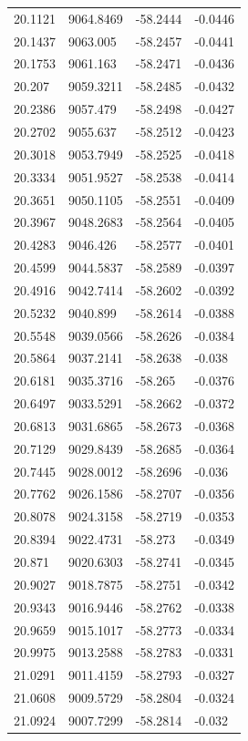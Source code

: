 \begin{table}[H]
\begin{tabular}{llll}
20.1121 & 9064.8469 & -58.2444 & -0.0446 \\
20.1437 & 9063.005 & -58.2457 & -0.0441 \\
20.1753 & 9061.163 & -58.2471 & -0.0436 \\
20.207 & 9059.3211 & -58.2485 & -0.0432 \\
20.2386 & 9057.479 & -58.2498 & -0.0427 \\
20.2702 & 9055.637 & -58.2512 & -0.0423 \\
20.3018 & 9053.7949 & -58.2525 & -0.0418 \\
20.3334 & 9051.9527 & -58.2538 & -0.0414 \\
20.3651 & 9050.1105 & -58.2551 & -0.0409 \\
20.3967 & 9048.2683 & -58.2564 & -0.0405 \\
20.4283 & 9046.426 & -58.2577 & -0.0401 \\
20.4599 & 9044.5837 & -58.2589 & -0.0397 \\
20.4916 & 9042.7414 & -58.2602 & -0.0392 \\
20.5232 & 9040.899 & -58.2614 & -0.0388 \\
20.5548 & 9039.0566 & -58.2626 & -0.0384 \\
20.5864 & 9037.2141 & -58.2638 & -0.038 \\
20.6181 & 9035.3716 & -58.265 & -0.0376 \\
20.6497 & 9033.5291 & -58.2662 & -0.0372 \\
20.6813 & 9031.6865 & -58.2673 & -0.0368 \\
20.7129 & 9029.8439 & -58.2685 & -0.0364 \\
20.7445 & 9028.0012 & -58.2696 & -0.036 \\
20.7762 & 9026.1586 & -58.2707 & -0.0356 \\
20.8078 & 9024.3158 & -58.2719 & -0.0353 \\
20.8394 & 9022.4731 & -58.273 & -0.0349 \\
20.871 & 9020.6303 & -58.2741 & -0.0345 \\
20.9027 & 9018.7875 & -58.2751 & -0.0342 \\
20.9343 & 9016.9446 & -58.2762 & -0.0338 \\
20.9659 & 9015.1017 & -58.2773 & -0.0334 \\
20.9975 & 9013.2588 & -58.2783 & -0.0331 \\
21.0291 & 9011.4159 & -58.2793 & -0.0327 \\
21.0608 & 9009.5729 & -58.2804 & -0.0324 \\
21.0924 & 9007.7299 & -58.2814 & -0.032 \\

\end{tabular}
\end{table}
